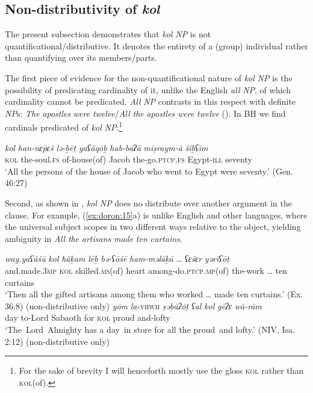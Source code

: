\documentclass[output=paper]{langsci/langscibook}
\begin{document}
\subsection{Non-distributivity of \textit{kol}}\label{sec:doron:3.1}%
\largerpage

The present subsection demonstrates that \textit{kol} \textit{NP} is not quantificational/distributive. It denotes the entirety of a (group) individual rather than quantifying over its members\slash parts.

The first piece of evidence for the non-quantificational nature of \textit{kol} \textit{NP} is the possibility of predicating cardinality of it, unlike the English \textit{all} \textit{NP}, of which cardinality cannot be predicated. \textit{All} \textit{NP} contrasts in this respect with definite \textit{NP}s: \textit{The} \textit{apostles} \textit{were} \textit{twelve}\slash *\textit{All} \textit{the} \textit{apostles} \textit{were} \textit{twelve} (\citealt{Dowty1987,Winter2002}). In BH we find cardinals predicated of \textit{kol} \textit{NP}:\footnote{For the sake of brevity I will henceforth mostly use the gloss \textsc{kol} rather than \textsc{kol}(of).}

\ea%
    \label{ex:doron:14}
    \gll \textit{kol}   \textit{han-nɛ\={p}ɛš}   \textit{lə-ḇēṯ}            \textit{yaʕăqōḇ}  \textit{hab-bāʔā}            \textit{miṣraym-ā}    \textit{šiḇʕīm}\\
         \textsc{kol} the-soul.\textsc{fs} of-house(of) Jacob       the-go.\textsc{ptcp.fs}   Egypt-\textsc{ill}      seventy\\
    \glt `All the persons of the house of Jacob who went to Egypt were seventy.' (Gen. 46:27)
\z

Second, as shown in , \textit{kol} \textit{NP} does no distribute over another argument in the clause. For example, (\ref{ex:doron:15}a) is unlike English and other languages, where the universal subject scopes in two different ways relative to the object, yielding ambiguity in \textit{All} \textit{the} \textit{artisans} \textit{made} \textit{ten} \textit{curtains}.

\ea%
    \label{ex:doron:15}
    \ea
    \gll \textit{way.yaʕăśū}      \textit{kol}   \textit{ħăḵam}            \textit{lēḇ}     \textit{bə-ʕōśē}                          \textit{ham-məlāḵā}  …  \textit{ʕɛśɛr}  \textit{yərīʕōṯ}\\
         and.made.\textsc{3mp} \textsc{kol} skilled.\textsc{ms}(of) heart among-do.\textsc{ptcp.mp}(of)  the-work      \textsc{…}   ten    curtains  \\
    \glt `Then all the gifted artisans among them who worked … made ten curtains.'   (Ex. 36:8)  (non-distributive only)
    \ex
    \gll \textit{yōm} \textit{la-}\textsc{yhwh} \textit{ṣəḇāʔōṯ}    \textit{ʕal}  \textit{kol}    \textit{gēʔɛ}    \textit{wā-rām}       \\
         day  to-Lord   Sabaoth   for  \textsc{kol}  proud and-lofty  \\
    \glt `The~Lord~Almighty has a day~in store for all the proud~and lofty.' (NIV, Isa. 2:12) (non-distributive only)
    \z
\z
\end{document}
